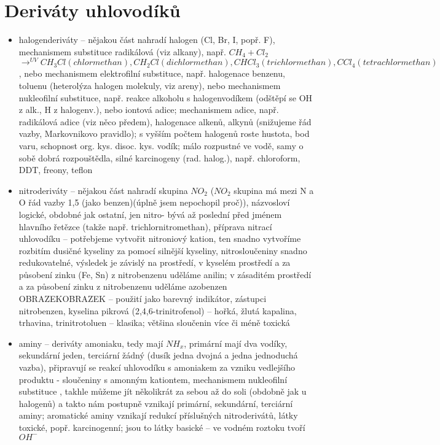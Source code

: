 \documentclass{article}
\begin{document}
\section{Deriváty uhlovodíků}
\begin{itemize}
  \item halogenderiváty -- nějakou část nahradí halogen (Cl, Br, I, popř. F), mechanismem substituce radikálová (viz alkany), např. $CH_4 + Cl_2$ $\rightarrow^{UV} CH_3Cl (chlormethan), CH_2Cl (dichlormethan), CHCl_3 (trichlormethan), CCl_4 (tetrachlormethan)$, nebo mechanismem elektrofilní substituce, např. halogenace benzenu, toluenu (heterolýza halogen molekuly, viz areny), nebo mechanismem nukleofilní substituce, např. reakce alkoholu s halogenvodíkem (odštěpí se OH z alk., H z halogenv.), nebo iontová adice; mechanismem adice, např. radikálová adice (viz něco předem), halogenace alkenů, alkynů (snižujeme řád vazby, Markovnikovo pravidlo); s vyšším počtem halogenů roste hustota, bod varu, schopnost org. kys. disoc. kys. vodík; málo rozpustné ve vodě, samy o sobě dobrá rozpouštědla, silné karcinogeny (rad. halog.), např. chloroform, DDT, freony, teflon
  \item nitroderiváty -- nějakou část nahradí skupina $NO_2$ ($NO_2$ skupina má mezi N a O řád vazby 1,5 (jako benzen)(úplně jsem nepochopil proč)), názvosloví logické, obdobné jak ostatní, jen nitro- bývá až poslední před jménem hlavního řetězce (takže např. trichlornitromethan), příprava nitrací uhlovodíku -- potřebjeme vytvořit nitroniový kation, ten snadno vytvoříme rozbitím dusičné kyseliny za pomocí silnější kyseliny, nitrosloučeniny snadno redukovatelné, výsledek je závislý na prostředí, v kyselém prostředí a za působení zinku (Fe, Sn) z nitrobenzenu uděláme anilin; v zásaditém prostředí a za působení zinku z nitrobenzenu uděláme azobenzen OBRAZEKOBRAZEK -- použití jako barevný indikátor, zástupci nitrobenzen, kyselina pikrová (2,4,6-trinitrofenol) -- hořká, žlutá kapalina, trhavina, trinitrotoluen -- klasika; většina sloučenin více či méně toxická
  \item aminy -- deriváty amoniaku, tedy mají $NH_x$, primární mají dva vodíky, sekundární jeden, terciární žádný (dusík jedna dvojná a jedna jednoduchá vazba), připravují se reakcí uhlovodíku s amoniakem za vzniku vedlejšího produktu - sloučeniny s amonným kationtem, mechanismem nukleofilní substituce , takhle můžeme jít několikrát za sebou až do soli (obdobně jak u halogenů) a takto nám postupně vznikají primární, sekundární, terciární aminy; aromatické aminy vznikají redukcí příslušných nitroderivátů, látky toxické, popř. karcinogenní; jsou to látky basické -- ve vodném roztoku tvoří $OH^-$
\end{itemize}
\end{document}
